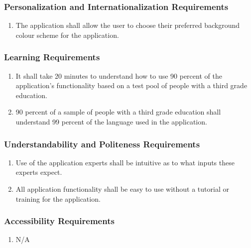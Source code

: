 \documentclass[titlepage]{article}
\begin{document}
\subsubsection{Personalization and Internationalization Requirements}
\label{ssub:personalization_and_internationalization_requirements}
\begin{enumerate}[{UH}1. ]
	\item The application shall allow the user to choose their preferred background colour scheme for the application. 
\end{enumerate}

\subsubsection{Learning Requirements}
\label{ssub:learning_requirements}
\begin{enumerate}[{UH}1. ]
	\item It shall take 20 minutes to understand how to use 90 percent of the application's functionality based on a test pool of people with a third grade education.
	
	\item 90 percent of a sample of people with a third grade education shall understand 99 percent of the language used in the application. 
\end{enumerate}

\subsubsection{Understandability and Politeness Requirements}
\label{ssub:understandability_and_politeness_requirements}
\begin{enumerate}[{UH}1. ]
	\item Use of the application experts shall be intuitive as to what inputs these experts expect.
	\item All application functionality shall be easy to use without a tutorial or training for the application.
\end{enumerate}

\subsubsection{Accessibility Requirements}
\label{ssub:accessibility_requirements}
\begin{enumerate}[{UH}1. ]
	\item N/A
\end{enumerate}
\end{document}
